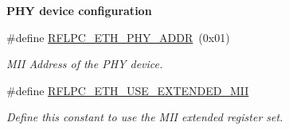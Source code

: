 \begin{Indent}{\bf P\-H\-Y device configuration}\par
\begin{DoxyCompactItemize}
\item 
\#define \hyperlink{group__config_ga4855717644cc229c169a9aad41e807c1}{R\-F\-L\-P\-C\-\_\-\-E\-T\-H\-\_\-\-P\-H\-Y\-\_\-\-A\-D\-D\-R}~(0x01)
\begin{DoxyCompactList}\small\item\em M\-I\-I Address of the P\-H\-Y device. \end{DoxyCompactList}\item 
\#define \hyperlink{group__config_ga02c4bc43d0f8f9c635f405bc9bd0b801}{R\-F\-L\-P\-C\-\_\-\-E\-T\-H\-\_\-\-U\-S\-E\-\_\-\-E\-X\-T\-E\-N\-D\-E\-D\-\_\-\-M\-I\-I}
\begin{DoxyCompactList}\small\item\em Define this constant to use the M\-I\-I extended register set. \end{DoxyCompactList}\end{DoxyCompactItemize}
\end{Indent}
